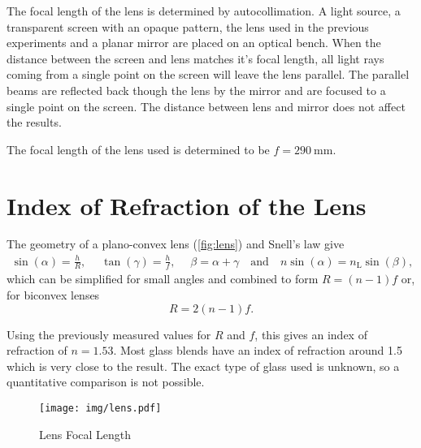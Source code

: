 The focal length of the lens is determined by autocollimation.
A light source, a transparent screen with an opaque pattern, the lens used in the previous experiments and a planar mirror are placed on an optical bench.
When the distance between the screen and lens matches it's focal length, all light rays coming from a single point on the screen will leave the lens parallel.
The parallel beams are reflected back though the lens by the mirror and are focused to a single point on the screen.
The distance between lens and mirror does not affect the results.

The focal length of the lens used is determined to be $f = \SI{290}{\mm}$.

\section{Index of Refraction of the Lens}
The geometry of a plano-convex lens (\autoref{fig:lens}) and Snell's law give
\begin{gather*}
	\sin(\alpha) = \frac{h}{R}, \quad\;
	\tan(\gamma) = \frac{h}{f}, \quad\;
	\beta = \alpha + \gamma \quad \text{and} \quad
	n \sin(\alpha) = n_\text{L} \sin(\beta),
\end{gather*}
which can be simplified for small angles and combined to form $R = \left(n - 1\right)f$ or, for biconvex lenses
\begin{equation*}
	R = 2 \left(n - 1\right)f.
\end{equation*}

Using the previously measured values for $R$ and $f$, this gives an index of refraction of $n = \num{1.53}$.
Most glass blends have an index of refraction around \num{1.5} which is very close to the result.
The exact type of glass used is unknown, so a quantitative comparison is not possible.

\begin{figure}[tbp]
	\centering
	\texttt{[image: img/lens.pdf]}
	\caption{Lens Focal Length}
	\label{fig:lens}
\end{figure}
